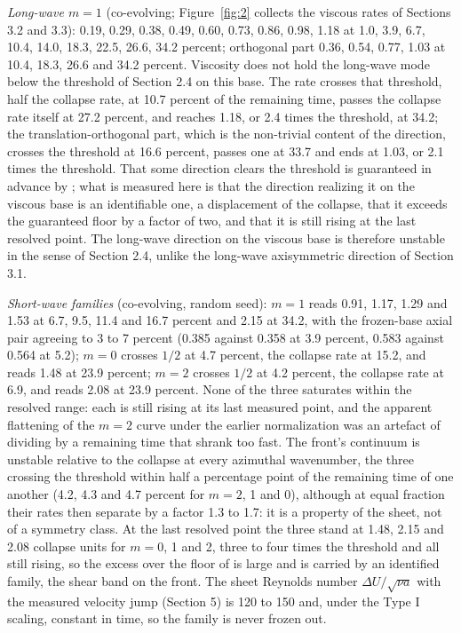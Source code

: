 \documentclass[11pt]{article}
\begin{document}
\emph{Long-wave $m = 1$} (co-evolving; Figure~\ref{fig:2} collects the viscous rates of Sections 3.2 and 3.3): 0.19, 0.29, 0.38, 0.49, 0.60, 0.73, 0.86, 0.98, 1.18 at 1.0, 3.9, 6.7, 10.4, 14.0, 18.3, 22.5, 26.6, 34.2 percent; orthogonal part 0.36, 0.54, 0.77, 1.03 at 10.4, 18.3, 26.6 and 34.2 percent. Viscosity does not hold the long-wave mode below the threshold of Section 2.4 on this base. The rate crosses that threshold, half the collapse rate, at 10.7 percent of the remaining time, passes the collapse rate itself at 27.2 percent, and reaches 1.18, or 2.4 times the threshold, at 34.2; the translation-orthogonal part, which is the non-trivial content of the direction, crosses the threshold at 16.6 percent, passes one at 33.7 and ends at 1.03, or 2.1 times the threshold. That some direction clears the threshold is guaranteed in advance by \cite{VV20,LVV21}; what is measured here is that the direction realizing it on the viscous base is an identifiable one, a displacement of the collapse, that it exceeds the guaranteed floor by a factor of two, and that it is still rising at the last resolved point. The long-wave direction on the viscous base is therefore unstable in the sense of Section 2.4, unlike the long-wave axisymmetric direction of Section 3.1.

\emph{Short-wave families} (co-evolving, random seed): $m = 1$ reads 0.91, 1.17, 1.29 and 1.53 at 6.7, 9.5, 11.4 and 16.7 percent and 2.15 at 34.2, with the frozen-base axial pair agreeing to 3 to 7 percent (0.385 against 0.358 at 3.9 percent, 0.583 against 0.564 at 5.2); $m = 0$ crosses $1/2$ at 4.7 percent, the collapse rate at 15.2, and reads 1.48 at 23.9 percent; $m = 2$ crosses $1/2$ at 4.2 percent, the collapse rate at 6.9, and reads 2.08 at 23.9 percent. None of the three saturates within the resolved range: each is still rising at its last measured point, and the apparent flattening of the $m = 2$ curve under the earlier normalization was an artefact of dividing by a remaining time that shrank too fast. The front's continuum is unstable relative to the collapse at every azimuthal wavenumber, the three crossing the threshold within half a percentage point of the remaining time of one another (4.2, 4.3 and 4.7 percent for $m = 2$, 1 and 0), although at equal fraction their rates then separate by a factor 1.3 to 1.7: it is a property of the sheet, not of a symmetry class. At the last resolved point the three stand at 1.48, 2.15 and 2.08 collapse units for $m = 0$, 1 and 2, three to four times the threshold and all still rising, so the excess over the floor of \cite{VV20,LVV21} is large and is carried by an identified family, the shear band on the front. The sheet Reynolds number $\Delta U / \sqrt{\nu a}$ with the measured velocity jump (Section 5) is 120 to 150 and, under the Type I scaling, constant in time, so the family is never frozen out.
\end{document}
